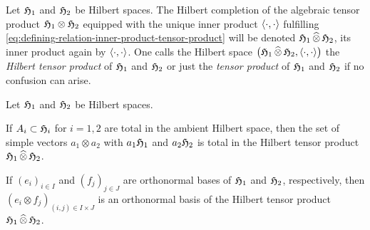 \begin{definition}
  Let $\mathfrak{H}_1$ and $\mathfrak{H}_2$ be Hilbert spaces.
  The Hilbert completion of the algebraic tensor product $\mathfrak{H}_1 \otimes \mathfrak{H}_2$
  equipped with the unique inner product $\langle \cdot,\cdot \rangle$  fulfilling 
  \eqref{eq:defining-relation-inner-product-tensor-product}
  will be denoted $\mathfrak{H}_1 {\,\widehat{\otimes}\,} \mathfrak{H}_2$, its inner product again by $\langle \cdot,\cdot \rangle$. One calls the Hilbert space 
  $\big(\mathfrak{H}_1 {\,\widehat{\otimes}\,} \mathfrak{H}_2 ,\langle \cdot,\cdot \rangle\big)$
  the \emph{Hilbert tensor product} of $\mathfrak{H}_1$ and $\mathfrak{H}_2$ or just the
  \emph{tensor product} of $\mathfrak{H}_1$ and $\mathfrak{H}_2$ if no confusion can arise.
\end{definition}

\begin{proposition}\label{thm:totality-tensor-product-total-sets}
  Let $\mathfrak{H}_1$ and $\mathfrak{H}_2$ be Hilbert spaces.
  \begin{romanlist}
  \item\label{ite:totality-simple-tensor-products-total-sets}
    If $A_i \subset \mathfrak{H}_i$ for $i=1,2$ are total in the ambient  Hilbert space,
    then the set of simple vectors $a_1\otimes a_2$ with $a_1 \mathfrak{H}_1$ and
    $a_2 \mathfrak{H}_2$ is total in the Hilbert
    tensor product  $\mathfrak{H}_1 {\,\widehat{\otimes}\,} \mathfrak{H}_2$. 
  \item
    If $(e_i)_{i\in I}$ and $(f_j)_{j\in J}$ are orthonormal bases of  $\mathfrak{H}_1$ and $\mathfrak{H}_2$,
    respectively, then $(e_i\otimes f_j)_{(i,j)\in I \times J}$ is an orthonormal basis of the Hilbert
    tensor product $\mathfrak{H}_1 {\,\widehat{\otimes}\,} \mathfrak{H}_2$.
  \end{romanlist}
\end{proposition}



